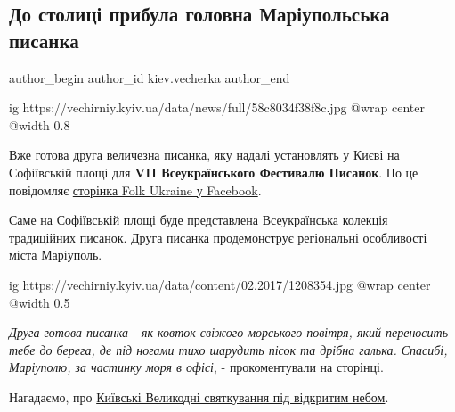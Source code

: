  
 
 
 
 
 
\subsection{До столиці прибула головна Маріупольська писанка}
\label{sec:14_03_2017.stz.kiev.vecherka.1.stolycja_golovna_mariupol_pysanka}
 
\ifcmt
 author_begin
   author_id kiev.vecherka
 author_end
\fi

\ifcmt
  ig https://vechirniy.kyiv.ua/data/news/full/58c8034f38f8c.jpg
  @wrap center
  @width 0.8
\fi

Вже готова друга величезна писанка, яку надалі установлять у Києві на
Софіївській площі для \textbf{VII Всеукраїнського Фестивалю Писанок}. По це повідомляє
\href{https://www.facebook.com/FolkUkraine/photos/a.425419950875352.1073741828.425064567577557/1307557605994911/?type=3&theater}{сторінка Folk Ukraine у Facebook}.

Саме на Софіївській площі буде представлена Всеукраїнська колекція традиційних
писанок. Друга писанка продемонструє регіональні особливості міста Маріуполь.

\ifcmt
  ig https://vechirniy.kyiv.ua/data/content/02.2017/1208354.jpg
  @wrap center
  @width 0.5
\fi

\emph{Друга готова писанка - як ковток свіжого морського повітря, який переносить
тебе до берега, де під ногами тихо шарудить пісок та дрібна галька. Спасибі,
Маріуполю, за частинку моря в офісі}, - прокоментували на сторінці.

Нагадаємо, про \href{https://vechirniy.kyiv.ua/news/12573}{Київські Великодні
святкування під відкритим небом}.
